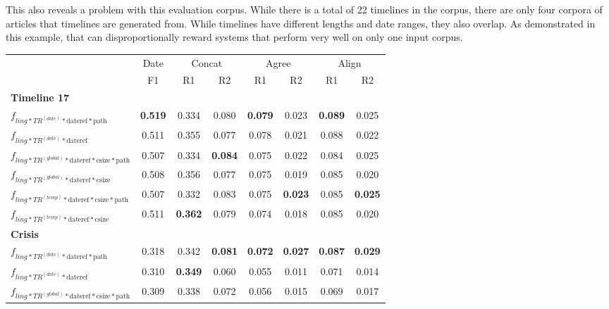 \documentclass[a4paper,BCOR=10mm]{report}
\numberwithin{lemma}{chapter}
\numberwithin{definition}{chapter}
\begin{document}
This also reveals a problem with this evaluation corpus. While there is a total of 22 timelines in the corpus, there are only four corpora of articles that timelines are generated from. While timelines have different lengths and date ranges, they also overlap. As demonstrated in this example, that can disproportionally reward systems that perform very well on only one input corpus.


\begin{table}
\begin{tabular}{|l|c|cc|cc|cc|}
\hline
 & Date & \multicolumn{ 2 }{|c|}{Concat} & \multicolumn{ 2 }{|c|}{Agree} & \multicolumn{ 2 }{|c|}{Align} \\
 & F1 & R1 & R2 & R1 & R2 & R1 & R2 \\\hline\hline
\multicolumn{8}{|l|}{ \textbf{Timeline 17}}\\\hline
$f_{ling*TR^{(date)}*\text{dateref}*\text{path}}$    & \textbf{0.519}   & 0.334 & 0.080 & \textbf{0.079}    & 0.023 & \textbf{0.089}    & 0.025 \\\hline
$f_{ling*TR^{(date)}*\text{dateref}}$    & 0.511    & 0.355 & 0.077 & 0.078 & 0.021 & 0.088 & 0.022 \\\hline
$f_{ling*TR^{(global)}*\text{dateref}*\text{csize}*\text{path}}$     & 0.507    & 0.334 & \textbf{0.084}    & 0.075 & 0.022 & 0.084 & 0.025 \\\hline
$f_{ling*TR^{(global)}*\text{dateref}*\text{csize}}$     & 0.508    & 0.356 & 0.077 & 0.075 & 0.019 & 0.085 & 0.020 \\\hline
$f_{ling*TR^{(temp)}*\text{dateref}*\text{csize}*\text{path}}$   & 0.507    & 0.332 & 0.083 & 0.075 & \textbf{0.023}    & 0.085 & \textbf{0.025} \\\hline
$f_{ling*TR^{(temp)}*\text{dateref}*\text{csize}}$   & 0.511    & \textbf{0.362}    & 0.079 & 0.074 & 0.018 & 0.085 & 0.020 \\\hline
\hline\multicolumn{8}{|l|}{ \textbf{Crisis}}\\\hline
$f_{ling*TR^{(date)}*\text{dateref}*\text{path}}$    & 0.318    & 0.342 & \textbf{0.081}    & \textbf{0.072}    & \textbf{0.027}    & \textbf{0.087}    & \textbf{0.029} \\\hline
$f_{ling*TR^{(date)}*\text{dateref}}$    & 0.310    & \textbf{0.349}    & 0.060 & 0.055 & 0.011 & 0.071 & 0.014 \\\hline
$f_{ling*TR^{(global)}*\text{dateref}*\text{csize}*\text{path}}$     & 0.309    & 0.338 & 0.072 & 0.056 & 0.015 & 0.069 & 0.017 \\\hline

\end{tabular}
\end{table}
\end{document}
